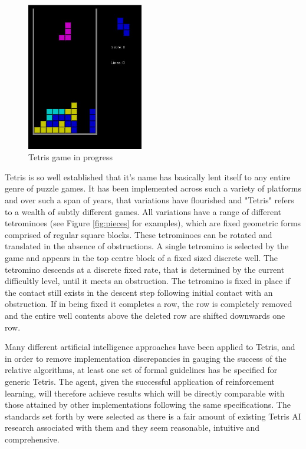 \documentclass[a4paper]{article}%
\begin{document}
\begin{figure}[h]
\centering%
\includegraphics[width=2in]{tetgame.jpg}
\caption{Tetris game in progress}
\label{fig:tetgame}
\end{figure}

Tetris is so well established that it's name has basically lent itself to any entire genre of puzzle games. It has been implemented across such a variety of platforms and over such a span of years, that variations have flourished and "Tetris" refers to a wealth of subtly different games. All variations have a range of different tetrominoes (see Figure \ref{fig:pieces} for examples), which are fixed geometric forms comprised of regular square blocks. These tetrominoes can be rotated and translated in the absence of obstructions. A  single tetromino is selected by the game and appears in the top centre block of a fixed sized discrete well. The tetromino descends at a discrete fixed rate, that is determined by the current difficultly level, until it meets an obstruction. The tetromino is fixed in place if the contact still exists in the descent step following initial contact with an obstruction. If in being fixed it completes a row, the row is completely removed and the entire well contents above the deleted row are shifted downwards one row.

Many different artificial intelligence approaches have been applied to Tetris, and in order to remove implementation discrepancies in gauging the success of the relative algorithms, at least one set of formal guidelines has be specified for generic Tetris. The agent, given the successful application of reinforcement learning, will therefore achieve results which will be directly comparable with those attained by other implementations following the same specifications. The standards set forth by \cite{tetstand} were selected as there is a fair amount of existing Tetris AI research associated with them and they seem reasonable, intuitive and comprehensive.
\end{document}
